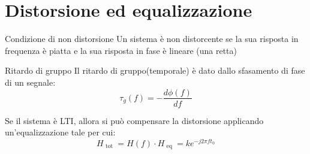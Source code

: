 \section{Distorsione ed equalizzazione}
\begin{definizione}{Condizione di non distorsione}
	Un sistema è non distorcente se la sua risposta in frequenza è piatta e la sua risposta in fase è lineare (una retta)

	\begin{minipage}[t]{0.48\textwidth}
	\end{minipage}
	\begin{minipage}[t]{0.48\textwidth}
	\end{minipage}
\end{definizione}
\begin{definizione}{Ritardo di gruppo}
	Il ritardo di gruppo(temporale) è dato dallo sfasamento di fase di un segnale:
	\[
		\tau_g\left(f\right) = -\frac{d \phi\left(f\right) }{df}
	\]
\end{definizione}
Se il sistema è LTI, allora si può compensare la distorsione applicando un'equalizzazione tale per cui:
\[
	H_{\text{ tot }} = H\left(f\right) \cdot  H_{\text{ eq }} = k e ^{-j 2 \pi f t_0}
\]
